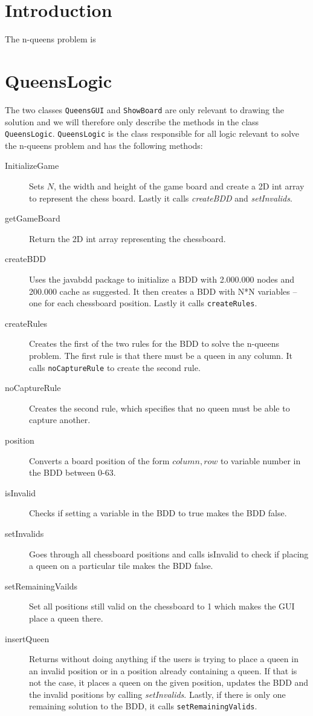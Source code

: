 \section{Introduction}
The n-queens problem is 
\section{QueensLogic}
The two classes \texttt{QueensGUI} and \texttt{ShowBoard} are only relevant to drawing the solution and we will therefore only describe the methods in the class \texttt{QueensLogic}. \texttt{QueensLogic} is the class responsible for all logic relevant to solve the n-queens problem and has the following methods:
\begin{description}
	\item[InitializeGame] Sets $N$, the width and height of the game board and create a 2D int array to represent the chess board. Lastly it calls \textit{createBDD} and \textit{setInvalids}.
	\item[getGameBoard] Return the 2D int array representing the chessboard.
	\item[createBDD] Uses the javabdd package to initialize a BDD with 2.000.000 nodes and 200.000 cache as suggested. It then creates a BDD with N*N variables -- one for each chessboard position. Lastly it calls \texttt{createRules}.
	\item[createRules] Creates the first of the two rules for the BDD to solve the n-queens problem. The first rule is that there must be a queen in any column. It calls \texttt{noCaptureRule} to create the second rule.
	\item[noCaptureRule] Creates the second rule, which specifies that no queen must be able to capture another.
	\item[position] Converts a board position of the form $column, row$ to variable number in the BDD between 0-63.	
	\item[isInvalid] Checks if setting a variable in the BDD to true makes the BDD false. 
	\item[setInvalids] Goes through all chessboard positions and calls isInvalid to check if placing a queen on a particular tile makes the BDD false.
	\item[setRemainingVailds] Set all positions still valid on the chessboard to 1 which makes the GUI place a queen there.
	\item[insertQueen] Returns without doing anything if the users is trying to place a queen in an invalid position or in a position already containing a queen. If that is not the case, it places a queen on the given position, updates the BDD and the invalid positions by calling \textit{setInvalids}. Lastly, if there is only one remaining solution to the BDD, it calls \texttt{setRemainingValids}.
\end{description}

